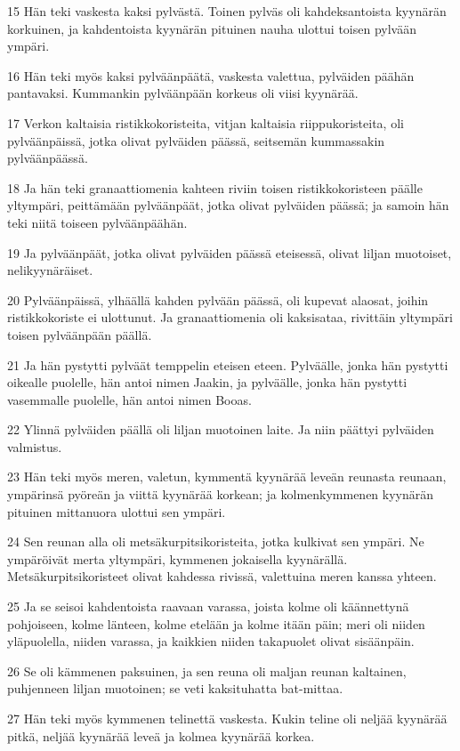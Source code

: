 \par 15 Hän teki vaskesta kaksi pylvästä. Toinen pylväs oli kahdeksantoista kyynärän korkuinen, ja kahdentoista kyynärän pituinen nauha ulottui toisen pylvään ympäri.
\par 16 Hän teki myös kaksi pylväänpäätä, vaskesta valettua, pylväiden päähän pantavaksi. Kummankin pylväänpään korkeus oli viisi kyynärää.
\par 17 Verkon kaltaisia ristikkokoristeita, vitjan kaltaisia riippukoristeita, oli pylväänpäissä, jotka olivat pylväiden päässä, seitsemän kummassakin pylväänpäässä.
\par 18 Ja hän teki granaattiomenia kahteen riviin toisen ristikkokoristeen päälle yltympäri, peittämään pylväänpäät, jotka olivat pylväiden päässä; ja samoin hän teki niitä toiseen pylväänpäähän.
\par 19 Ja pylväänpäät, jotka olivat pylväiden päässä eteisessä, olivat liljan muotoiset, nelikyynäräiset.
\par 20 Pylväänpäissä, ylhäällä kahden pylvään päässä, oli kupevat alaosat, joihin ristikkokoriste ei ulottunut. Ja granaattiomenia oli kaksisataa, rivittäin yltympäri toisen pylväänpään päällä.
\par 21 Ja hän pystytti pylväät temppelin eteisen eteen. Pylväälle, jonka hän pystytti oikealle puolelle, hän antoi nimen Jaakin, ja pylväälle, jonka hän pystytti vasemmalle puolelle, hän antoi nimen Booas.
\par 22 Ylinnä pylväiden päällä oli liljan muotoinen laite. Ja niin päättyi pylväiden valmistus.
\par 23 Hän teki myös meren, valetun, kymmentä kyynärää leveän reunasta reunaan, ympärinsä pyöreän ja viittä kyynärää korkean; ja kolmenkymmenen kyynärän pituinen mittanuora ulottui sen ympäri.
\par 24 Sen reunan alla oli metsäkurpitsikoristeita, jotka kulkivat sen ympäri. Ne ympäröivät merta yltympäri, kymmenen jokaisella kyynärällä. Metsäkurpitsikoristeet olivat kahdessa rivissä, valettuina meren kanssa yhteen.
\par 25 Ja se seisoi kahdentoista raavaan varassa, joista kolme oli käännettynä pohjoiseen, kolme länteen, kolme etelään ja kolme itään päin; meri oli niiden yläpuolella, niiden varassa, ja kaikkien niiden takapuolet olivat sisäänpäin.
\par 26 Se oli kämmenen paksuinen, ja sen reuna oli maljan reunan kaltainen, puhjenneen liljan muotoinen; se veti kaksituhatta bat-mittaa.
\par 27 Hän teki myös kymmenen telinettä vaskesta. Kukin teline oli neljää kyynärää pitkä, neljää kyynärää leveä ja kolmea kyynärää korkea.
